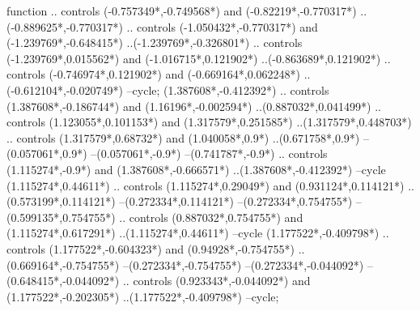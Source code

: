 {\begin{scope}[x=1mm,y=1mm,line width=\SCstroke mm,line cap=round,line join=round]
\begin{SCpart}{function}
.. controls ({-0.757349*\SCF},{-0.749568*\SCF}) and ({-0.82219*\SCF},{-0.770317*\SCF}) ..({-0.889625*\SCF},{-0.770317*\SCF})
.. controls ({-1.050432*\SCF},{-0.770317*\SCF}) and ({-1.239769*\SCF},{-0.648415*\SCF}) ..({-1.239769*\SCF},{-0.326801*\SCF})
.. controls ({-1.239769*\SCF},{0.015562*\SCF}) and ({-1.016715*\SCF},{0.121902*\SCF}) ..({-0.863689*\SCF},{0.121902*\SCF})
.. controls ({-0.746974*\SCF},{0.121902*\SCF}) and ({-0.669164*\SCF},{0.062248*\SCF}) ..({-0.612104*\SCF},{-0.020749*\SCF})
--cycle;
 ({1.387608*\SCF},{-0.412392*\SCF})
.. controls ({1.387608*\SCF},{-0.186744*\SCF}) and ({1.16196*\SCF},{-0.002594*\SCF}) ..({0.887032*\SCF},{0.041499*\SCF})
.. controls ({1.123055*\SCF},{0.101153*\SCF}) and ({1.317579*\SCF},{0.251585*\SCF}) ..({1.317579*\SCF},{0.448703*\SCF})
.. controls ({1.317579*\SCF},{0.68732*\SCF}) and ({1.040058*\SCF},{0.9*\SCF}) ..({0.671758*\SCF},{0.9*\SCF})
--({0.057061*\SCF},{0.9*\SCF})
--({0.057061*\SCF},{-0.9*\SCF})
--({0.741787*\SCF},{-0.9*\SCF})
.. controls ({1.115274*\SCF},{-0.9*\SCF}) and ({1.387608*\SCF},{-0.666571*\SCF}) ..({1.387608*\SCF},{-0.412392*\SCF})
--cycle
({1.115274*\SCF},{0.44611*\SCF})
.. controls ({1.115274*\SCF},{0.29049*\SCF}) and ({0.931124*\SCF},{0.114121*\SCF}) ..({0.573199*\SCF},{0.114121*\SCF})
--({0.272334*\SCF},{0.114121*\SCF})
--({0.272334*\SCF},{0.754755*\SCF})
--({0.599135*\SCF},{0.754755*\SCF})
.. controls ({0.887032*\SCF},{0.754755*\SCF}) and ({1.115274*\SCF},{0.617291*\SCF}) ..({1.115274*\SCF},{0.44611*\SCF})
--cycle
({1.177522*\SCF},{-0.409798*\SCF})
.. controls ({1.177522*\SCF},{-0.604323*\SCF}) and ({0.94928*\SCF},{-0.754755*\SCF}) ..({0.669164*\SCF},{-0.754755*\SCF})
--({0.272334*\SCF},{-0.754755*\SCF})
--({0.272334*\SCF},{-0.044092*\SCF})
--({0.648415*\SCF},{-0.044092*\SCF})
.. controls ({0.923343*\SCF},{-0.044092*\SCF}) and ({1.177522*\SCF},{-0.202305*\SCF}) ..({1.177522*\SCF},{-0.409798*\SCF})
--cycle;
\end{SCpart}
\end{scope}
}
